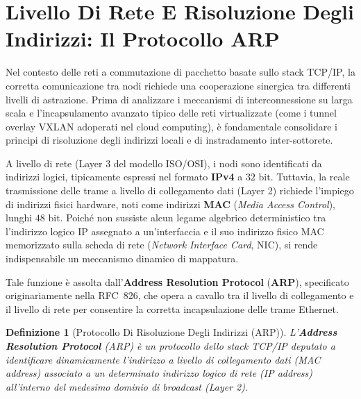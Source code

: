 \documentclass[11pt, a4paper]{article}
\newtheorem{theorem}{Definizione}
\begin{document}


\section{Livello Di Rete E Risoluzione Degli Indirizzi: Il Protocollo ARP}

Nel contesto delle reti a commutazione di pacchetto basate sullo stack TCP/IP, la corretta comunicazione tra nodi richiede una cooperazione sinergica tra differenti livelli di astrazione. Prima di analizzare i meccanismi di interconnessione su larga scala e l'incapsulamento avanzato tipico delle reti virtualizzate (come i tunnel overlay VXLAN adoperati nel cloud computing), è fondamentale consolidare i principi di risoluzione degli indirizzi locali e di instradamento inter-sottorete.

A livello di rete (Layer 3 del modello ISO/OSI), i nodi sono identificati da indirizzi logici, tipicamente espressi nel formato \textbf{IPv4} a $32\text{ bit}$. Tuttavia, la reale trasmissione delle trame a livello di collegamento dati (Layer 2) richiede l'impiego di indirizzi fisici hardware, noti come indirizzi \textbf{MAC} (\emph{Media Access Control}), lunghi $48\text{ bit}$. Poiché non sussiste alcun legame algebrico deterministico tra l'indirizzo logico IP assegnato a un'interfaccia e il suo indirizzo fisico MAC memorizzato sulla scheda di rete (\emph{Network Interface Card}, NIC), si rende indispensabile un meccanismo dinamico di mappatura.

Tale funzione è assolta dall'\textbf{Address Resolution Protocol} (\textbf{ARP}), specificato originariamente nella RFC~826, che opera a cavallo tra il livello di collegamento e il livello di rete per consentire la corretta incapsulazione delle trame Ethernet.

\begin{theorem}[Protocollo Di Risoluzione Degli Indirizzi (ARP)]
L'\textbf{Address Resolution Protocol} (ARP) è un protocollo dello stack TCP/IP deputato a identificare dinamicamente l'indirizzo a livello di collegamento dati (\emph{MAC address}) associato a un determinato indirizzo logico di rete (\emph{IP address}) all'interno del medesimo dominio di broadcast (Layer 2).
\end{theorem}
\end{document}
